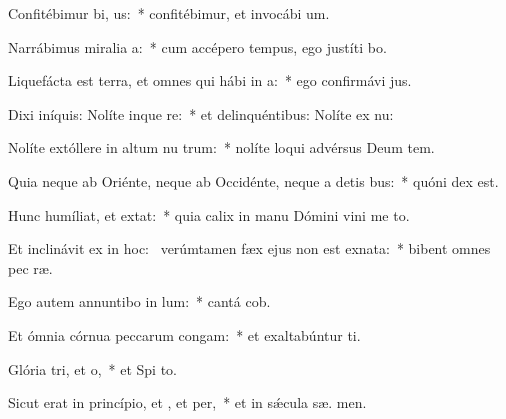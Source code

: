 \item Confitébimur bi, us:~* confitébimur, et invocábi  um.
\item Narrábimus miralia a:~* cum accépero tempus, ego justíti bo.
\item Liquefácta est terra, et omnes qui hábi in a:~* ego confirmávi  jus.
\item Dixi iníquis: Nolíte inque re:~* et delinquéntibus: Nolíte ex nu:
\item Nolíte extóllere in altum nu trum:~* nolíte loqui advérsus Deum tem.
\item Quia neque ab Oriénte, neque ab Occidénte, neque a detis bus:~* quóni  dex est.
\item Hunc humíliat, et  extat:~* quia calix in manu Dómini vini me  to.
\item Et inclinávit ex  in hoc:~\pscross{} verúmtamen fæx ejus non est exnata:~* bibent omnes pec ræ.
\item Ego autem annuntibo in lum:~* cantá  cob.
\item Et ómnia córnua peccarum congam:~* et exaltabúntur  ti.
\item Glória tri, et o,~* et Spi to.
\item Sicut erat in princípio, et , et per,~* et in sǽcula sæ. men.
